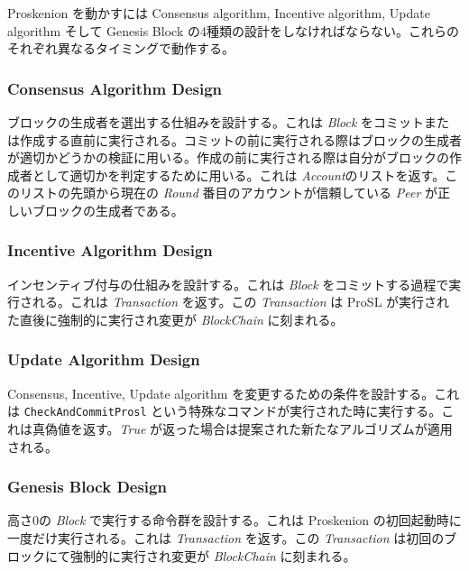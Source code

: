 Proskenion を動かすには Consensus algorithm, Incentive algorithm, Update
algorithm そして Genesis Block
の4種類の設計をしなければならない。これらのそれぞれ異なるタイミングで動作する。

\hypertarget{consensus-algorithm-design}{%
\subsubsection{Consensus Algorithm
Design}\label{consensus-algorithm-design}}

ブロックの生成者を選出する仕組みを設計する。これは \emph{Block}
をコミットまたは作成する直前に実行される。コミットの前に実行される際はブロックの生成者が適切かどうかの検証に用いる。作成の前に実行される際は自分がブロックの作成者として適切かを判定するために用いる。これは
\emph{Account}のリストを返す。このリストの先頭から現在の \emph{Round}
番目のアカウントが信頼している \emph{Peer}
が正しいブロックの生成者である。

\hypertarget{incentive-algorithm-design}{%
\subsubsection{Incentive Algorithm
Design}\label{incentive-algorithm-design}}

インセンティブ付与の仕組みを設計する。これは \emph{Block}
をコミットする過程で実行される。これは \emph{Transaction} を返す。この
\emph{Transaction} は ProSL が実行された直後に強制的に実行され変更が
\emph{BlockChain} に刻まれる。

\hypertarget{update-algorithm-design}{%
\subsubsection{Update Algorithm Design}\label{update-algorithm-design}}

Consensus, Incentive, Update algorithm
を変更するための条件を設計する。これは \texttt{CheckAndCommitProsl}
という特殊なコマンドが実行された時に実行する。これは真偽値を返す。\emph{True}
が返った場合は提案された新たなアルゴリズムが適用される。

\hypertarget{genesis-block-design}{%
\subsubsection{Genesis Block Design}\label{genesis-block-design}}

高さ0の \emph{Block} で実行する命令群を設計する。これは Proskenion
の初回起動時に一度だけ実行される。これは \emph{Transaction} を返す。この
\emph{Transaction} は初回のブロックにて強制的に実行され変更が
\emph{BlockChain} に刻まれる。


